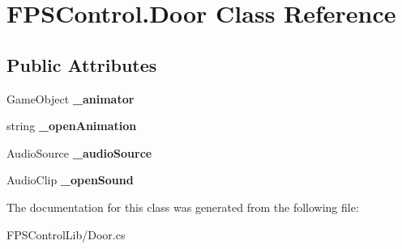 \hypertarget{class_f_p_s_control_1_1_door}{\section{F\-P\-S\-Control.\-Door Class Reference}
\label{class_f_p_s_control_1_1_door}
}
\subsection*{Public Attributes}
\begin{DoxyCompactItemize}
\item 
\hypertarget{class_f_p_s_control_1_1_door_a5507ad5290fb7f0dbfa802965eaed6c6}{Game\-Object {\bfseries \-\_\-animator}}\label{class_f_p_s_control_1_1_door_a5507ad5290fb7f0dbfa802965eaed6c6}

\item 
\hypertarget{class_f_p_s_control_1_1_door_ad7991b6f9da52f8325f56a7465a4f301}{string {\bfseries \-\_\-open\-Animation}}\label{class_f_p_s_control_1_1_door_ad7991b6f9da52f8325f56a7465a4f301}

\item 
\hypertarget{class_f_p_s_control_1_1_door_af6bef137fef3917949901d343d71f1ec}{Audio\-Source {\bfseries \-\_\-audio\-Source}}\label{class_f_p_s_control_1_1_door_af6bef137fef3917949901d343d71f1ec}

\item 
\hypertarget{class_f_p_s_control_1_1_door_a00d508b00ac048ee3da799b4a9599930}{Audio\-Clip {\bfseries \-\_\-open\-Sound}}\label{class_f_p_s_control_1_1_door_a00d508b00ac048ee3da799b4a9599930}

\end{DoxyCompactItemize}


The documentation for this class was generated from the following file\-:\begin{DoxyCompactItemize}
\item 
F\-P\-S\-Control\-Lib/Door.\-cs\end{DoxyCompactItemize}
